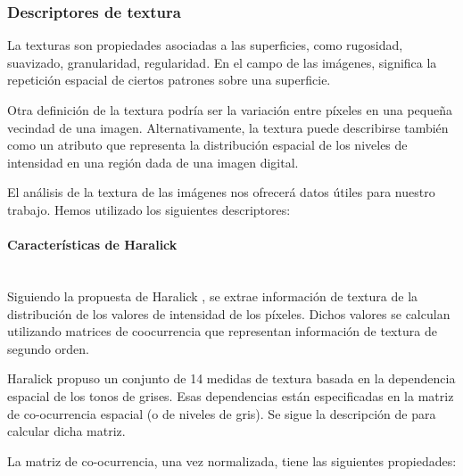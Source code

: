 \subsubsection{Descriptores de textura}
La texturas son propiedades asociadas a las superficies, como rugosidad, suavizado, granularidad, regularidad. En el campo de las imágenes, significa la repetición espacial de ciertos patrones sobre una superficie.

Otra definición de la textura podría ser la variación entre píxeles en una pequeña vecindad de una imagen. Alternativamente, la textura puede describirse también como un atributo que representa la distribución espacial de los niveles de intensidad en una región dada de una imagen digital.


El análisis de la textura de las imágenes nos ofrecerá datos útiles para nuestro trabajo. Hemos utilizado los siguientes descriptores:

\paragraph*{Características de Haralick}\mbox{} \\
\indent Siguiendo la propuesta de Haralick \cite{haralick1992computer}, se extrae información de textura de la distribución de los valores de intensidad de los píxeles. Dichos valores se calculan utilizando matrices de coocurrencia que representan información de textura de segundo orden.

Haralick propuso un conjunto de 14 medidas de textura basada en la dependencia espacial de los tonos de grises. Esas dependencias están especificadas en la matriz de co-ocurrencia espacial (o de niveles de gris). Se sigue la descripción de \cite{presutti2004matriz} para calcular dicha matriz.

La matriz de co-ocurrencia, una vez normalizada, tiene las siguientes propiedades:

